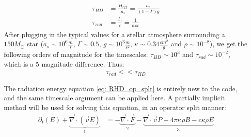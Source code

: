 \begin{align}
\tau_{HD} &= \frac{H_{eff}}{a_s}= \frac{a_s}{(1-\Gamma)g} \\
\tau_{rad} &= \frac{l_\gamma}{c} = \frac{1}{\kappa \rho c}
\end{align}
After plugging in the typical values for a stellar atmosphere surrounding a $150 M_\odot$ star ($a_s \sim 10^6 \frac{m}{s}$, $\Gamma \sim 0.5$, $g \sim 10^3 \frac{m}{s^2}$, $\kappa \sim 0.34 \frac{cm^2}{g}$ and $\rho \sim 10^{-8}$), we get the following orders of magnitude for the timescales: $\tau_{HD} \sim 10^{3}$ and $\tau_{rad} \sim 10^{-2} $, which is a 5 magnitude difference. Thus:
\begin{align}
\tau_{rad} << \tau_{HD}
\end{align} 

The radiation energy equation \eqref{eq: RHD_op_splt} is entirely new to the code, and the same timescale argument can be applied here. A partially implicit method will be used for solving this equation, in an operator split manner: \\

\begin{align}
\partial_t \left(E \right) + \underbrace{\vec{\nabla} \cdot \left( \vec{v} E \right)}_{1}  &= - \underbrace{\vec{\nabla} \cdot \vec{F}}_{2} - \underbrace{\vec{\nabla} \cdot \vec{v} P + 4\pi \kappa\rho B - c \kappa \rho E}_{3} \label{eq: RHD_op_splt}\\
\end{align} 

